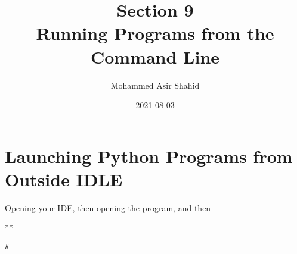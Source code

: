 \documentclass[11pt]{article}
\author{Mohammed Asir Shahid}
\date{2021-08-03}
\title{Section 9\\\medskip
\large Running Programs from the Command Line}
\begin{document}
\maketitle
\tableofcontents


\section{Launching Python Programs from Outside IDLE}
\label{sec:org4d7157c}

Opening your IDE, then opening the program, and then

**

\begin{verbatim}
#
\end{verbatim}
\end{document}
